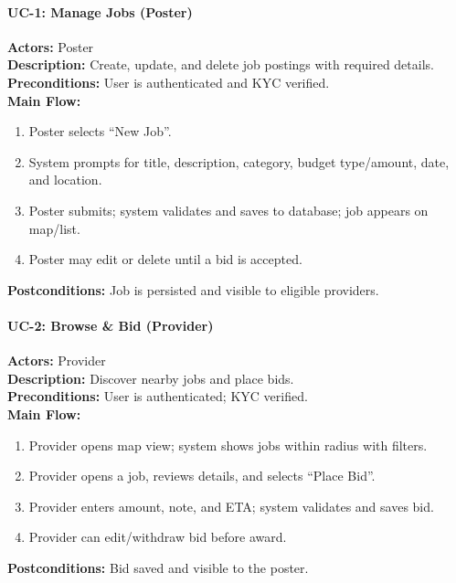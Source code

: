 \documentclass[11pt]{article}
\begin{document}
\paragraph{UC-1: Manage Jobs (Poster)}
\textbf{Actors:} Poster\\
\textbf{Description:} Create, update, and delete job postings with required details.\\
\textbf{Preconditions:} User is authenticated and KYC verified.\\
\textbf{Main Flow:}
\begin{enumerate}[leftmargin=1.4em]
  \item Poster selects ``New Job''.
  \item System prompts for title, description, category, budget type/amount, date, and location.
  \item Poster submits; system validates and saves to database; job appears on map/list.
  \item Poster may edit or delete until a bid is accepted.
\end{enumerate}
\textbf{Postconditions:} Job is persisted and visible to eligible providers.

\paragraph{UC-2: Browse \& Bid (Provider)}
\textbf{Actors:} Provider\\
\textbf{Description:} Discover nearby jobs and place bids.\\
\textbf{Preconditions:} User is authenticated; KYC verified.\\
\textbf{Main Flow:}
\begin{enumerate}[leftmargin=1.4em]
  \item Provider opens map view; system shows jobs within radius with filters.
  \item Provider opens a job, reviews details, and selects ``Place Bid''.
  \item Provider enters amount, note, and ETA; system validates and saves bid.
  \item Provider can edit/withdraw bid before award.
\end{enumerate}
\textbf{Postconditions:} Bid saved and visible to the poster.
\end{document}
